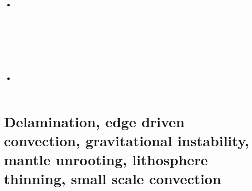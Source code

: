 \begin{scriptsize}
\begin{itemize}
\textcite{nigw18} \\
\textcite{bemc18} \\
\textcite{neew18} \\
\textcite{stbe18} \\
\item[\twothousandnineteen] 
\textcite{koen19} \\
\textcite{kipd19} \\
\textcite{crcm19} \\
\textcite{pedm19} \\
\textcite{mazz19} \\
\textcite{chch19} \\
\textcite{jart19} \\
\item[\twothousandtwenty] 
\textcite{yamq20} \\ 
\textcite{miko20} \\ 
\end{itemize}
\end{scriptsize}


\section{Delamination, edge driven convection, gravitational instability, mantle unrooting, lithosphere thinning, small scale convection} 

